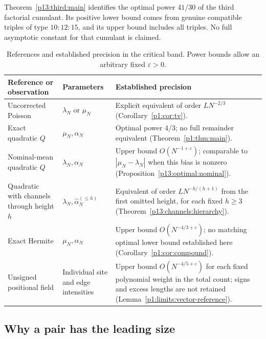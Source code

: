 Theorem~\ref{p13:third:main} identifies the optimal power $41/30$
of the third factorial cumulant. Its positive lower bound comes
from genuine compatible triples of type $10:12:15$,
and its upper bound includes all triples.
No full asymptotic constant for that cumulant is claimed.
\begin{table}[!htb]
\centering
\small
\caption{References and established precision in the critical band.
Power bounds allow an arbitrary fixed \(\varepsilon>0\).}
\label{p16:tab:references}
\begin{tabularx}{\textwidth}{@{}>{\raggedright\arraybackslash}p{}>{\raggedright\arraybackslash}p{}>{\raggedright\arraybackslash}X@{}}
\toprule
Reference or observation & Parameters & Established precision\\
\midrule
Uncorrected Poisson
& \(\lambda_N\) or \(\mu_N\)
& Explicit equivalent of order \(LN^{-2/3}\)
(Corollary~\ref{p1:cor:tv}).\\[4pt]
Exact quadratic \(Q\)
& \(\mu_N,\alpha_N\)
& Optimal power \(4/3\); no full remainder equivalent
(Theorem~\ref{p1:thm:main}).\\[4pt]
Nominal-mean quadratic \(Q\)
& \(\lambda_N,\alpha_N\)
& Upper bound \(O(N^{-1+\varepsilon})\); comparable to
\(|\mu_N-\lambda_N|\) when this bias is nonzero
(Proposition~\ref{p13:optimal:nominal}).\\[4pt]
Quadratic with channels through height \(h\)
& \(\lambda_N,\widehat\alpha_N^{(\le h)}\)
& Equivalent of order \(LN^{-h/(h+1)}\) from the first
omitted height, for each fixed \(h\ge3\)
(Theorem~\ref{p13:channels:hierarchy}).\\[4pt]
Exact Hermite
& \(\mu_N,\alpha_N\)
& Upper bound \(O(N^{-4/3+\varepsilon})\); no matching
optimal lower bound established here
(Corollary~\ref{p1:cor:compound}).\\[4pt]
Unsigned positional field
& Individual site and edge intensities
& Upper bound \(O(N^{-4/5+\varepsilon})\) for each fixed
polynomial weight in the total count; signs and excess lengths are not retained
(Lemma~\ref{p1:limits:vector-reference}).\\
\bottomrule
\end{tabularx}
\end{table}
\FloatBarrier

\subsection{Why a pair has the leading size}
\label{p1:intro:mechanism}

